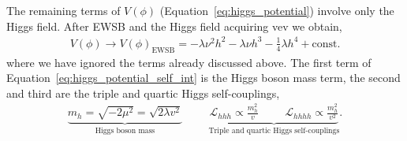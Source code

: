 The remaining terms of $V(\phi)$ (Equation~\ref{eq:higgs_potential}) involve only the Higgs field. After
EWSB and the Higgs field acquiring vev we obtain,
\begin{align}
	V(\phi) \rightarrow V(\phi)_{\text{EWSB}} =  -\lambda \nu^2 h^2 - \lambda \nu h^3 - \frac{1}{4} \lambda h^4 + \text{const.}
	\label{eq:higgs_potential_self_int}
\end{align}
where we have ignored the terms already discussed above. The first term of Equation~\ref{eq:higgs_potential_self_int}
is the Higgs boson mass term, the second and third are the triple and quartic Higgs self-couplings,
\begin{align}
	\underbrace{m_{h} = \sqrt{ - 2 \mu^2} = \sqrt{ 2 \lambda v^2 }}_\text{Higgs boson mass} \hspace{1cm} \underbrace{\mathcal{L}_{hhh} \propto \frac{m_h^2}{v} \hspace{1cm} \mathcal{L}_{hhhh} \propto \frac{m_h^2}{v^2}}_\text{Triple and quartic Higgs self-couplings}.
	\label{eq:higgs_self_couplings}
\end{align}



